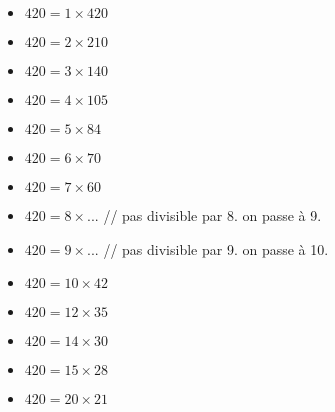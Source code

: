 \documentclass[11pt]{article}
\begin{document}
\begin{multicols}{2}

\begin{itemize}
\item $420 = 1 \times 420$
\item $420 = 2 \times 210$
\item $420 = 3 \times 140$
\item $420 = 4 \times 105$
\item $420 = 5 \times 84$
\item $420 = 6 \times 70$
\item $420 = 7 \times 60$
\item $420 = 8 \times ...$ // pas divisible par 8. on passe à 9.
\item $420 = 9 \times ...$ // pas divisible par 9. on passe à 10.
\item $420 = 10 \times 42$
\item $420 = 12 \times 35$
\item $420 = 14 \times 30$
\item $420 = 15 \times 28$
\item $420 = 20 \times 21$
\end{itemize}
\end{multicols}
\end{document}
